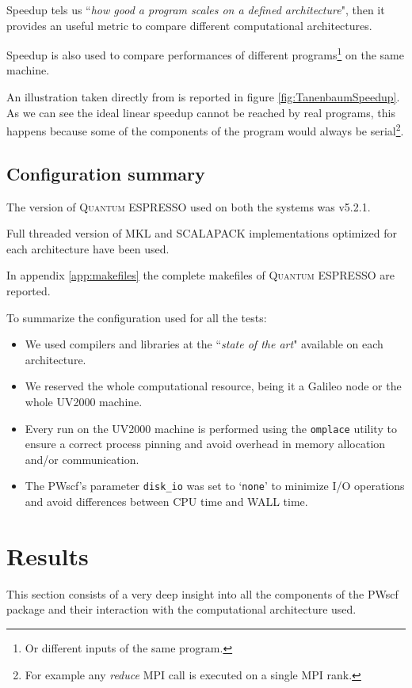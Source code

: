 \documentclass[a4paper,12pt]{article}
\newcommand\QE{\textsc{Quantum} ESPRESSO }
\begin{document}
Speedup tels us ``\textit{how good a program scales on a defined architecture}", then it provides an useful metric to compare different computational architectures.

Speedup is also used to compare performances of different programs\footnote{Or different inputs of the same program.} on the same machine.



An illustration taken directly from \cite{Tanenbaum} is reported in figure \ref{fig:TanenbaumSpeedup}.
As we can see the ideal linear speedup cannot be reached by real programs, this happens because some of the components of the program would always be serial\footnote{For example any \textit{reduce} MPI call is executed on a single MPI rank.}.

\subsection{Configuration summary}\label{sec:ConfSummary}

The version of \QE used on both the systems was v5.2.1.

Full threaded version of MKL and SCALAPACK implementations optimized for each architecture have been used.

In appendix \ref{app:makefiles} the complete makefiles of \QE are reported.

To summarize the configuration used for all the tests:
\begin{itemize}
	\item We used compilers and libraries at the ``\textit{state of the art}" available on each architecture.
	\item We reserved the whole computational resource, being it a Galileo node or the whole UV2000 machine.
	\item Every run on the UV2000 machine is performed using the \texttt{omplace} utility to ensure a correct process pinning and avoid overhead in memory allocation and/or communication.
	\item The PWscf's parameter \texttt{disk\_io} was set to `\texttt{none}' to minimize I/O operations and avoid differences between CPU time and WALL time.
\end{itemize}

\newpage




\section{Results}\label{sec:results}
This section consists of a very deep insight into all the components of the PWscf package and their interaction with the computational architecture used.
\end{document}
